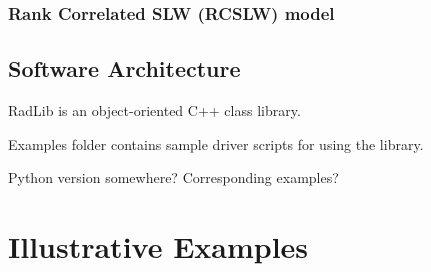 \documentclass[preprint,12pt, a4paper]{elsarticle}
\begin{document}
\subsubsection{Rank Correlated SLW (RCSLW) model}
\label{s:RCSLW}

\subsection{Software Architecture}
\label{s:architechture}

RadLib is an object-oriented C++ class library. 

Examples folder contains sample driver scripts for using the library. 

Python version somewhere? Corresponding examples?


\section{Illustrative Examples}
\label{s:Examples}
\end{document}
